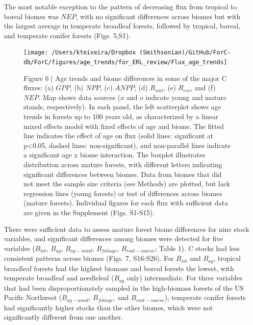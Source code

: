 \documentclass[
]{article}
\begin{document}
The most notable exception to the pattern of decreasing flux from
tropical to boreal biomes was \(NEP\), with no significant differences
across biomes but with the largest average in temperate broadleaf
forests, followed by tropical, boreal, and temperate conifer forests
(Figs. 5,S1).

\begin{figure}[H]

{\centering \texttt{[image: /Users/kteixeira/Dropbox (Smithsonian)/GitHub/ForC-db/ForC/figures/age\_trends/for\_ERL\_review/Flux\_age\_trends]} 

}

\caption{Figure 6 | Age trends and biome differences in some of the major C fluxes: (a) $GPP$, (b) $NPP$, (c) $ANPP$, (d) $R_{soil}$, (e) $R_{eco}$, and (f) $NEP$. Map shows data sources ($x$ and $o$ indicate young and mature stands, respectively). In each panel, the left scatterplot shows age trends in forests up to 100 years old, as characterized by a linear mixed effects model with fixed effects of age and biome. The fitted line indicates the effect of age on flux (solid lines: significant at p<0.05, dashed lines: non-significant), and non-parallel lines indicate a significant age x biome interaction. The boxplot illustrates distribution across mature forests, with different letters indicating significant differences between biomes. Data from biomes that did not meet the sample size criteria (see Methods) are plotted, but lack regression lines (young forests) or test of differences across biomes (mature forests). Individual figures for each flux with sufficient data are given in the Supplement (Figs. S1-S15).}\label{fig:unnamed-chunk-13}
\end{figure}

There were sufficient data to assess mature forest biome differences for
nine stock variables, and significant differences among biomes were
detected for five variables (\(B_{tot}\), \(B_{ag}\), \(B_{ag-wood}\),
\(B_{foliage}\), \(B_{root-coarse}\); Table 1). C stocks had less
consistent patterns across biomes (Figs. 7, S16-S26). For \(B_{tot}\)
and \(B_{ag}\), tropical broadleaf forests had the highest biomass and
boreal forests the lowest, with temperate broadleaf and needleleaf
(\(B_{ag}\) only) intermediate. For three variables that had been
disproportionately sampled in the high-biomass forests of the US Pacific
Northwest (\(B_{ag-wood}\), \(B_{foliage}\), and \(B_{root-coarse}\)),
temperate conifer forests had significantly higher stocks than the other
biomes, which were not significantly different from one another.
\end{document}
